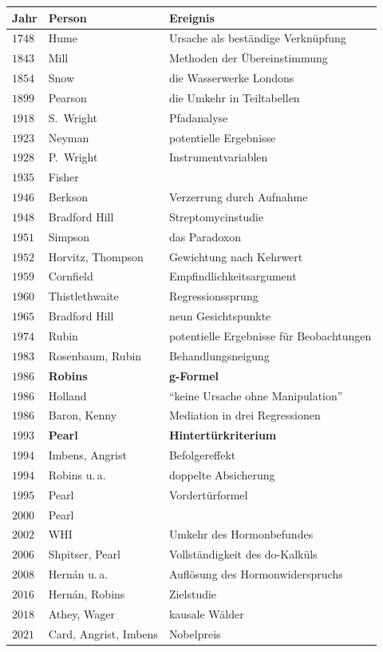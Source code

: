 \begin{merksatz}
\begin{center}
{\small
\renewcommand{\arraystretch}{1.32}
\begin{tabular}{@{}P{1.3cm}P{3.0cm}P{4.0cm}@{}}
\toprule
\textbf{Jahr} & \textbf{Person} & \textbf{Ereignis}\\
\midrule
$1748$ & Hume & Ursache als beständige Verknüpfung\\
$1843$ & Mill & Methoden der Übereinstimmung\\
$1854$ & Snow & die Wasserwerke Londons\\
$1899$ & Pearson & die Umkehr in Teiltabellen\\
$1918$ & S.\ Wright & Pfadanalyse\\
$1923$ & Neyman & potentielle Ergebnisse\\
$1928$ & P.\ Wright & Instrumentvariablen\\
$1935$ & Fisher & \\
$1946$ & Berkson & Verzerrung durch Aufnahme\\
$1948$ & Bradford Hill & Streptomycinstudie\\
$1951$ & Simpson & das Paradoxon\\
$1952$ & Horvitz, Thompson & Gewichtung nach Kehrwert\\
$1959$ & Cornfield & Empfindlichkeits\-argument\\
$1960$ & Thistlethwaite & Regressionssprung\\
$1965$ & Bradford Hill & neun Gesichtspunkte\\
$1974$ & Rubin & potentielle Ergebnisse für Beobachtungen\\
$1983$ & Rosenbaum, Rubin & Behandlungsneigung\\
$1986$ & \textbf{Robins} & \textbf{g-Formel}\\
$1986$ & Holland & \enquote{keine Ursache ohne Manipulation}\\
$1986$ & Baron, Kenny & Mediation in drei Regressionen\\
$1993$ & \textbf{Pearl} & \textbf{Hintertürkriterium}\\
$1994$ & Imbens, Angrist & Befolgereffekt\\
$1994$ & Robins u.\,a. & doppelte Absicherung\\
$1995$ & Pearl & Vordertürformel\\
$2000$ & Pearl & \\
$2002$ & WHI & Umkehr des Hormonbefundes\\
$2006$ & Shpitser, Pearl & Vollständigkeit des do-Kalküls\\
$2008$ & Hernán u.\,a. & Auflösung des Hormonwiderspruchs\\
$2016$ & Hernán, Robins & Zielstudie\\
$2018$ & Athey, Wager & kausale Wälder\\
$2021$ & Card, Angrist, Imbens & Nobelpreis\\
\bottomrule
\end{tabular}}
\end{center}
\end{merksatz}

